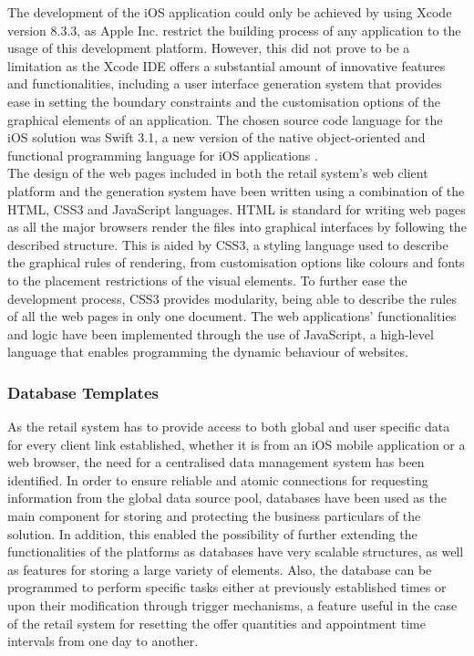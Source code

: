 The development of the iOS application could only be achieved by using Xcode version 8.3.3, as Apple Inc. restrict the building process of any application to the usage of this development platform. However, this did not prove to be a limitation as the Xcode IDE offers a substantial amount of innovative features and functionalities, including a user interface generation system that provides ease in setting the boundary constraints and the customisation options of the graphical elements of an application. The chosen source code language for the iOS solution was Swift 3.1, a new version of the native object-oriented and functional programming language for iOS applications \cite{swift_2014}.\\

The design of the web pages included in both the retail system's web client platform and the generation system have been written using a combination of the HTML, CSS3 and JavaScript languages. HTML is standard for writing web pages as all the major browsers render the files into graphical interfaces by following the described structure. This is aided by CSS3, a styling language used to describe the graphical rules of rendering, from customisation options like colours and fonts to the placement restrictions of the visual elements. To further ease the development process, CSS3 provides modularity, being able to describe the rules of all the web pages in only one document. The web applications' functionalities and logic have been implemented through the use of JavaScript, a high-level language that enables programming the dynamic behaviour of websites\cite{schifreen_2010}.\\

\subsubsection{Database Templates}

As the retail system has to provide access to both global and user specific data for every client link established, whether it is from an iOS mobile application or a web browser, the need for a centralised data management system has been identified. In order to ensure reliable and atomic connections for requesting information from the global data source pool, databases have been used as the main component for storing and protecting the business particulars of the solution. In addition, this enabled the possibility of further extending the functionalities of the platforms as databases have very scalable structures, as well as features for storing a large variety of elements\cite{what_is_database}. Also, the database can be programmed to perform specific tasks either at previously established times or upon their modification through trigger mechanisms, a feature useful in the case of the retail system for resetting the offer quantities and appointment time intervals from one day to another.\\

